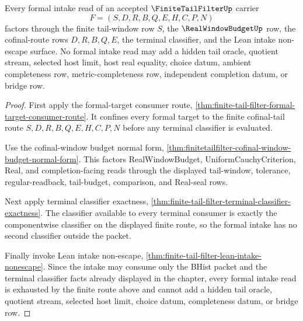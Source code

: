\begin{theorem}
\label{thm:finitetailfilter-formal-intake-route-exhaustion}
Every formal intake read of an accepted $\FiniteTailFilterUp$ carrier
$$
F=(S,D,R,B,Q,E,H,C,P,N)
$$
factors through the finite tail-window row $S$, the $\RealWindowBudgetUp$ row, the cofinal-route rows $D,R,B,Q,E$, the terminal classifier, and the Lean intake non-escape surface. No formal intake read may add a hidden tail oracle, quotient stream, selected host limit, host real equality, choice datum, ambient completeness row, metric-completeness row, independent completion datum, or bridge row.
\end{theorem}
\begin{proof}
First apply the formal-target consumer route, \autoref{thm:finite-tail-filter-formal-target-consumer-route}. It confines every formal target to the finite cofinal-tail route $S,D,R,B,Q,E,H,C,P,N$ before any terminal classifier is evaluated.

Use the cofinal-window budget normal form, \autoref{thm:finitetailfilter-cofinal-window-budget-normal-form}. This factors RealWindowBudget, UniformCauchyCriterion, Real, and completion-facing reads through the displayed tail-window, tolerance, regular-readback, tail-budget, comparison, and Real-seal rows.

Next apply terminal classifier exactness, \autoref{thm:finite-tail-filter-terminal-classifier-exactness}. The classifier available to every terminal consumer is exactly the componentwise classifier on the displayed finite route, so the formal intake has no second classifier outside the packet.

Finally invoke Lean intake non-escape, \autoref{thm:finite-tail-filter-lean-intake-nonescape}. Since the intake may consume only the BHist packet and the terminal classifier facts already displayed in the chapter, every formal intake read is exhausted by the finite route above and cannot add a hidden tail oracle, quotient stream, selected host limit, choice datum, completeness datum, or bridge row.
\end{proof}

